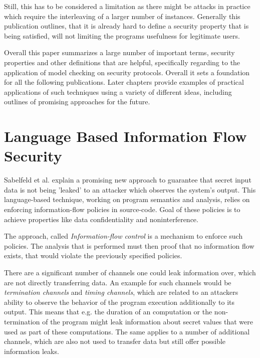 \documentclass[a4paper,UKenglish]{lipics-v2018}
\begin{document}
Still, this has to be considered a limitation as there might be attacks in practice which require the interleaving of a larger number of instances. Generally this publication outlines, that it is already hard to define a security property that is being satisfied, will not limiting the programs usefulness for legitimate users.

Overall this paper summarizes a large number of important terms, security properties and other definitions that are helpful, specifically regarding to the application of model checking on security protocols. Overall it sets a foundation for all the following publications. Later chapters provide examples of practical applications of such techniques using a variety of different ideas, including outlines of promising approaches for the future.






\section{Language Based Information Flow Security}

Sabelfeld et al. explain a promising new approach to guarantee that secret input data is not being 'leaked' to an attacker which observes the system's output. This language-based technique, working on program semantics and analysis, relies on enforcing information-flow policies in source-code. Goal of these policies is to achieve properties like data confidentiality and noninterference.\cite{language_based_information_flow_security}

The approach, called \textit{Information-flow control} is a mechanism to enforce such policies. The analysis that is performed must then proof that no information flow exists, that would violate the previously specified policies.\cite{language_based_information_flow_security}

There are a significant number of channels one could leak information over, which are not directly transferring data. An example for such channels would be \textit{termination channels} and \textit{timing channels}, which are related to an attackers ability to observe the behavior of the program execution additionally to its output. This means that e.g. the duration of an computation or the non-termination of the program might leak information about secret values that were used as part of these computations.
The same applies to a number of additional channels, which are also not used to transfer data but still offer possible information leaks.\cite{language_based_information_flow_security} %
\end{document}
